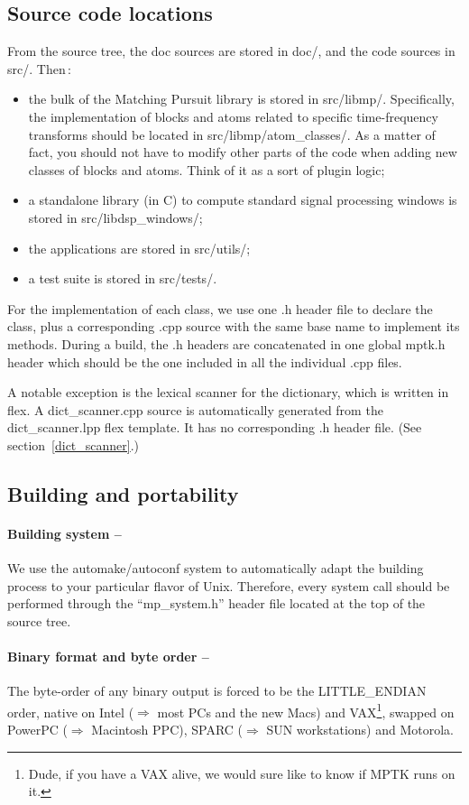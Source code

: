 \documentclass[11pt,a4paper]{article}
\begin{document}
\subsection{Source code locations}
From the source tree, the doc sources are stored in doc/, and the code sources
in src/. Then\,:
\begin{itemize}
\item the bulk of the Matching Pursuit library is stored in src/libmp/.
  Specifically, the implementation of blocks and atoms related to specific
  time-frequency transforms should be located in src/libmp/atom\_classes/. As a
  matter of fact, you should not have to modify other parts of the code when
  adding new classes of blocks and atoms. Think of it as a sort of plugin
  logic;
\item a standalone library (in C) to compute standard signal processing windows
  is stored in src/libdsp\_windows/;
\item the applications are stored in src/utils/;
\item a test suite is stored in src/tests/.
\end{itemize}
For the implementation of each class, we use one .h header file to declare the
class, plus a corresponding .cpp source with the same base name to implement
its methods. During a build, the .h headers are concatenated in one global
mptk.h header which should be the one included in all the individual .cpp
files.

A notable exception is the lexical scanner for the dictionary, which is written
in flex. A dict\_scanner.cpp source is automatically generated from the
dict\_scanner.lpp flex template. It has no corresponding .h header file. (See
section~\ref{dict_scanner}.)


\subsection{Building and portability}

\paragraph{Building system --} We use the automake/autoconf system
to automatically adapt the building process to your particular flavor of Unix.
Therefore, every system call should be performed through the ``mp\_system.h''
header file located at the top of the source tree.

\paragraph{Binary format and byte order --} The byte-order of any binary output
is forced to be the LITTLE\_ENDIAN order, native on Intel ($\Rightarrow$ most
PCs and the new Macs) and VAX\footnote{Dude, if you have a VAX alive, we would
  sure like to know if MPTK runs on it.}, swapped on PowerPC ($\Rightarrow$
Macintosh PPC), SPARC ($\Rightarrow$ SUN workstations) and Motorola.
\end{document}
